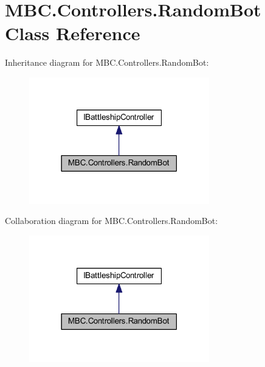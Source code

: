 \hypertarget{class_m_b_c_1_1_controllers_1_1_random_bot}{\section{M\-B\-C.\-Controllers.\-Random\-Bot Class Reference}
\label{class_m_b_c_1_1_controllers_1_1_random_bot}
}


Inheritance diagram for M\-B\-C.\-Controllers.\-Random\-Bot\-:
\nopagebreak
\begin{figure}[H]
\begin{center}
\leavevmode
\includegraphics[width=222pt]{class_m_b_c_1_1_controllers_1_1_random_bot__inherit__graph}
\end{center}
\end{figure}


Collaboration diagram for M\-B\-C.\-Controllers.\-Random\-Bot\-:
\nopagebreak
\begin{figure}[H]
\begin{center}
\leavevmode
\includegraphics[width=222pt]{class_m_b_c_1_1_controllers_1_1_random_bot__coll__graph}
\end{center}
\end{figure}
